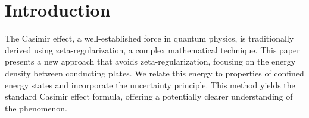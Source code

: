 \section{Introduction}

The Casimir effect, a well-established force in quantum physics, 
is traditionally derived using zeta-regularization, a complex mathematical technique. 
This paper presents a new approach that avoids zeta-regularization, 
focusing on the  energy density between conducting plates. 
We relate this energy to properties of confined energy states and incorporate the uncertainty principle. 
This method yields the standard Casimir effect formula, offering a potentially clearer understanding of the phenomenon.